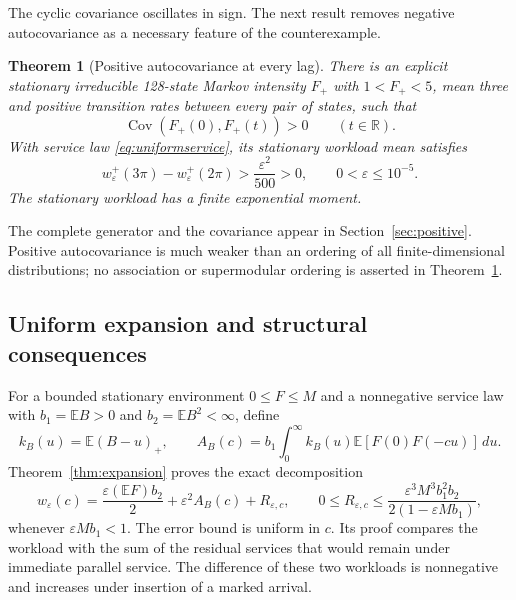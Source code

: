 \documentclass[11pt,reqno]{amsart}
\numberwithin{equation}{section}
\theoremstyle{plain}
\newtheorem{theorem}{Theorem}[section]
\theoremstyle{definition}
\newcommand{\E}{\mathbb E}
\newcommand{\R}{\mathbb R}
\newcommand{\1}{\mathbf 1}
\newcommand{\eps}{\varepsilon}
\DeclareMathOperator{\Cov}{Cov}
\begin{document}
The cyclic covariance oscillates in sign. The next result removes negative autocovariance as a necessary feature of the counterexample.
\begin{theorem}[Positive autocovariance at every lag]\label{thm:positive}
There is an explicit stationary irreducible 128-state Markov intensity $F_+$ with $1<F_+<5$, mean three and positive transition rates between every pair of states, such that
\begin{equation}\label{eq:poscovintro}
 \Cov(F_+(0),F_+(t))>0\qquad(t\in\R).
\end{equation}
With service law \eqref{eq:uniformservice}, its stationary workload mean satisfies
\begin{equation}\label{eq:positivegap}
 w^+_\eps(3\pi)-w^+_\eps(2\pi)>\frac{\eps^2}{500}>0,
 \qquad 0<\eps\le10^{-5}.
\end{equation}
The stationary workload has a finite exponential moment.
\end{theorem}
The complete generator and the covariance appear in Section~\ref{sec:positive}. Positive autocovariance is much weaker than an ordering of all finite-dimensional distributions; no association or supermodular ordering is asserted in Theorem~\ref{thm:positive}.

\subsection{Uniform expansion and structural consequences}
For a bounded stationary environment $0\le F\le M$ and a nonnegative service law with $b_1=\E B>0$ and $b_2=\E B^2<\infty$, define
\begin{equation}\label{eq:kernelintro}
 k_B(u)=\E(B-u)_+,
 \qquad
 A_B(c)=b_1\int_0^\infty k_B(u)\E[F(0)F(-cu)]\,du.
\end{equation}
Theorem~\ref{thm:expansion} proves the exact decomposition
\begin{equation}\label{eq:introexp}
 w_\eps(c)=\frac{\eps(\E F)b_2}{2}+\eps^2A_B(c)+R_{\eps,c},
 \qquad
 0\le R_{\eps,c}\le
 \frac{\eps^3M^3b_1^2b_2}{2(1-\eps Mb_1)},
\end{equation}
whenever $\eps Mb_1<1$. The error bound is uniform in $c$. Its proof compares the workload with the sum of the residual services that would remain under immediate parallel service. The difference of these two workloads is nonnegative and increases under insertion of a marked arrival.
\end{document}
